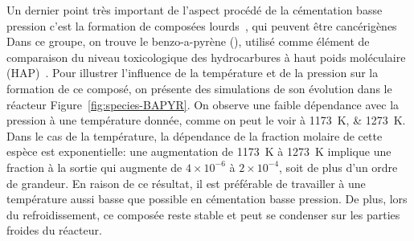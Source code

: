 Un dernier point très important de l'aspect procédé de la cémentation basse pression c'est la formation de composées lourds~\cite{Sanchez201230,Sanchez2013126}, qui peuvent être cancérigènes Dans ce groupe, on trouve le benzo-a-pyrène (), utilisé comme élément de comparaison du niveau toxicologique des hydrocarbures à haut poids moléculaire (HAP)~\cite{Bensabath2016}. Pour illustrer l'influence de la température et de la pression sur la formation de ce composé, on présente des simulations de son évolution dans le réacteur Figure~\ref{fig:species-BAPYR}. On observe une faible dépendance avec la pression à une température donnée, comme on peut le voir à \SIlist{1173;1273}{\kelvin}. Dans le cas de la température, la dépendance de la fraction molaire de cette espèce est exponentielle: une augmentation de \SI{1173}{\kelvin} à \SI{1273}{\kelvin} implique une fraction à la sortie qui augmente de $4{}\times{}10^{-6}$ à $2{}\times{}10^{-4}$, soit de plus d'un ordre de grandeur. En raison de ce résultat, il est préférable de travailler à une température aussi basse que possible en cémentation basse pression. De plus, lors du refroidissement, ce composée reste stable et peut se condenser sur les parties froides du réacteur.

